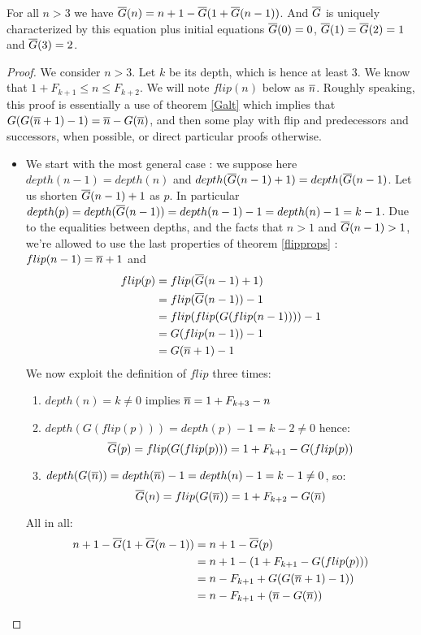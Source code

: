 \documentclass[a4paper,11pt]{article}
\begin{document}
\begin{theorem}\label{FGeqn}
For all $n>3$ we have $\overline{G}(n) = n+1 - \overline{G}(1+\overline{G}(n-1))$.
And $\overline{G}$ is uniquely characterized by this equation
plus initial equations $\overline{G}(0)=0$, $\overline{G}(1)=\overline{G}(2)=1$ and
$\overline{G}(3)=2$.
\end{theorem}
\begin{proof}
We consider $n>3$. Let $k$ be its depth, which is hence at
least 3. We know that $1+F_{k+1} \le n \le F_{k+2}$. We will note
$flip(n)$ below as $\overline{n}$. Roughly speaking, this proof is
essentially a use of theorem \ref{Galt} which implies that
$G(G(\overline{n}+1)-1) = \overline{n} - G(\overline{n})$, and then some
play with flip and predecessors and successors, when possible,
or direct particular proofs otherwise.
\begin{itemize}
\item We start with the most general case : we suppose here
$depth(n-1)=depth(n)$ and $depth(\overline{G}(n-1)+1)=depth(\overline{G}(n-1)$.
Let us shorten $\overline{G}(n-1)+1$ as $p$. In particular
$depth(p)=depth(\overline{G}(n-1))=depth(n-1)-1=depth(n)-1=k-1$.
Due to the equalities between depths, and the facts that
$n>1$ and $\overline{G}(n-1)>1$, we're allowed to use the
last properties of theorem \ref{flipprops} : $flip(n-1)=\overline{n}+1$ and
\begin{align*}
flip(p) &= flip(\overline{G}(n-1)+1) \\
        &= flip(\overline{G}(n-1))-1 \\
        &= flip(flip(G(flip(n-1))))-1 \\
        &= G(flip(n-1))-1 \\
        &= G(\overline{n}+1)-1
\end{align*}
We now exploit the definition of $flip$ three times:
\begin{enumerate}
\item $depth(n)=k\neq 0$ implies $\overline{n}=1+F_{k+3}-n$
\item $depth(G(flip(p)))=depth(p)-1=k-2 \neq 0$ hence:
$$\overline{G}(p) = flip(G(flip(p))) = 1+F_{k+1}-G(flip(p))$$
\item $depth(G(\overline{n}))=depth(\overline{n})-1=depth(n)-1=k-1 \neq 0$, so:
$$\overline{G}(n)=flip(G(\overline{n}))=1+F_{k+2}-G(\overline{n})$$
\end{enumerate}
All in all:
\begin{align*}
n+1-\FG(1+\FG(n-1)) & = n+1-\FG(p) \\
                    & = n+1-(1+F_{k+1}-G(flip(p))) \\
                    & = n-F_{k+1}+G(G(\nn+1)-1)) \\
                    & = n-F_{k+1}+(\nn-G(\nn)) \\

\end{align*}
\end{itemize}
\end{proof}
\end{document}
